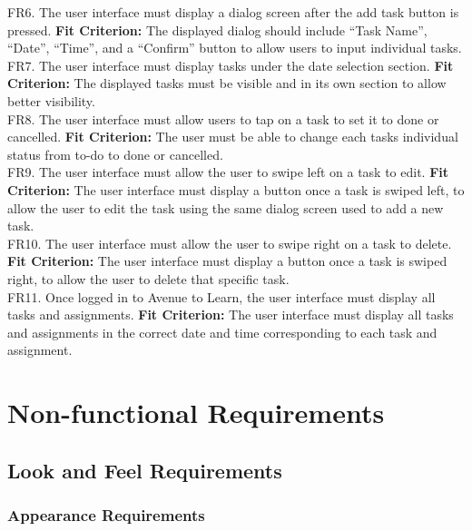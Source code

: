 \documentclass[12pt, titlepage]{article}
\begin{document}
\noindent FR6. The user interface must display a dialog screen after the add task button is pressed.
	\textbf{Fit Criterion:} The displayed dialog should include “Task Name”, “Date”, “Time”, and a 
“Confirm” button to allow users to input individual tasks.\\

\noindent FR7. The user interface must display tasks under the date selection section.
	\textbf{Fit Criterion:} The displayed tasks must be visible and in its own section to allow better 
visibility.\\

\noindent FR8. The user interface must allow users to tap on a task to set it to done or cancelled.
	\textbf{Fit Criterion:} The user must be able to change each tasks individual status from to-do to 
done or cancelled. \\

\noindent FR9. The user interface must allow the user to swipe left on a task to edit.
	\textbf{Fit Criterion:} The user interface must display a button once a task is swiped left, to 
allow the user to edit the task using the same dialog screen used to add a new task.\\

\noindent FR10. The user interface must allow the user to swipe right on a task to delete.
	\textbf{Fit Criterion:} The user interface must display a button once a task is swiped right, to 
allow the user to delete that specific task.\\

\noindent FR11. Once logged in to Avenue to Learn, the user interface must display all tasks and assignments.
	\textbf{Fit Criterion:} The user interface must display all tasks and assignments in the correct 
date and time corresponding to each task and assignment.

\section{Non-functional Requirements}

\subsection{Look and Feel Requirements}

\subsubsection{Appearance Requirements}
\end{document}
